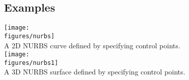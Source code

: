 
\subsection{Examples}
% 
  \begin{center}
  \texttt{[image: \\figures/nurbs]} \\
  {A 2D NURBS curve defined by specifying control points.} \\
  \texttt{[image: \\figures/nurbs1]} \\
  {A 3D NURBS surface defined by specifying control points.}
  \end{center}

